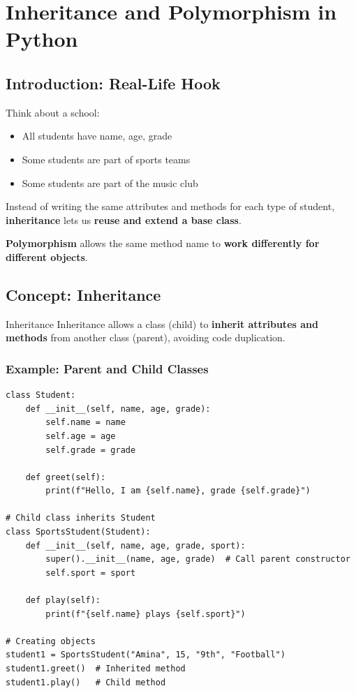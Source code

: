 \chapter{Inheritance and Polymorphism in Python}

\section{Introduction: Real-Life Hook}

Think about a school:

\begin{itemize}
    \item All students have name, age, grade  
    \item Some students are part of sports teams  
    \item Some students are part of the music club  
\end{itemize}

Instead of writing the same attributes and methods for each type of student, \textbf{inheritance} lets us \textbf{reuse and extend a base class}.  

\textbf{Polymorphism} allows the same method name to \textbf{work differently for different objects}.

\section{Concept: Inheritance}

\begin{definition}{Inheritance}
Inheritance allows a class (child) to \textbf{inherit attributes and methods} from another class (parent), avoiding code duplication.
\end{definition}

\subsection{Example: Parent and Child Classes}

\begin{verbatim}
class Student:
    def __init__(self, name, age, grade):
        self.name = name
        self.age = age
        self.grade = grade

    def greet(self):
        print(f"Hello, I am {self.name}, grade {self.grade}")

# Child class inherits Student
class SportsStudent(Student):
    def __init__(self, name, age, grade, sport):
        super().__init__(name, age, grade)  # Call parent constructor
        self.sport = sport

    def play(self):
        print(f"{self.name} plays {self.sport}")

# Creating objects
student1 = SportsStudent("Amina", 15, "9th", "Football")
student1.greet()  # Inherited method
student1.play()   # Child method
\end{verbatim}

